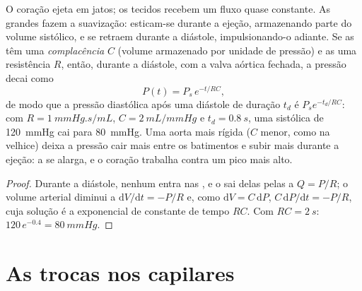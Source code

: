 \begin{theorem}\label{thm:b2:blood-circulation:windkessel}
O coração ejeta em jatos; os tecidos recebem um fluxo quase constante.
As grandes  fazem a suavização: esticam-se durante a ejeção,
armazenando parte do volume sistólico, e se retraem durante a diástole,
impulsionando-o adiante. Se as  têm uma \emph{complacência}
$C$ (volume armazenado por unidade de pressão) e as  uma
resistência $R$, então, durante a diástole, com a valva aórtica
fechada, a pressão decai como
\[
P(t) = P_{s}\,e^{-t/RC},
\]
de modo que a pressão diastólica após uma diástole de duração $t_d$ é
$P_s e^{-t_d/RC}$: com $R = \qty{1}{mmHg.s/mL}$, $C =
\qty{2}{mL/mmHg}$ e $t_d = \qty{0.8}{s}$, uma sistólica de
\qty{120}{mmHg} cai para \qty{80}{mmHg}. Uma aorta mais rígida ($C$
menor, como na velhice) deixa a pressão cair mais entre os batimentos e
subir mais durante a ejeção: a \emph{} se alarga, e o
coração trabalha contra um pico mais alto.
\end{theorem}
\begin{proof}
Durante a diástole, nenhum  entra nas , e o  sai
delas pelas  a $Q = P/R$; o volume arterial diminui a
$\mathrm{d}V/\mathrm{d}t = -P/R$ e, como $\mathrm{d}V = C\,
\mathrm{d}P$, $C\,\mathrm{d}P/\mathrm{d}t = -P/R$, cuja solução é a
exponencial de constante de tempo $RC$. Com $RC = \qty{2}{s}$:
$120\,e^{-0.4} = \qty{80}{mmHg}$.
\end{proof}

\section{As trocas nos capilares}

